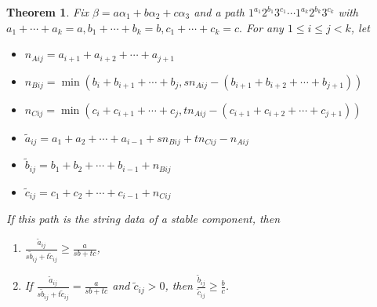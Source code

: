 \documentclass{amsart}
\numberwithin{equation}{section}
\numberwithin{figure}{section}
\numberwithin{table}{section}
\newtheorem{Theorem}[equation]{Theorem}
\theoremstyle{definition}
\begin{document}
\begin{Theorem} \label{th:cond2}
Fix  $\beta= a\alpha_1+b\alpha_2+c \alpha_3$ and a path $1^{a_1}2^{b_1} 3^{c_1} \cdots 1^{a_k}2^{b_k}3^{c_k}$ with
$a_1+\cdots + a_k=a, b_1+\cdots + b_k=b, c_1+\cdots + c_k=c.$ For any  
 $ 1\leq i \leq j < k$, let
\begin{itemize}
    \item $n_{Aij}=a_{i+1}+a_{i+2}+\cdots+a_{j+1}$
    \item $n_{Bij}=\min(b_i+b_{i+1}+\cdots+b_{j},sn_{Aij}-(b_{i+1}+b_{i+2}+\cdots+b_{j+1}))$
    \item $n_{Cij}=\min(c_i+c_{i+1}+\cdots+c_{j}, tn_{Aij}-(c_{i+1}+c_{i+2}+\cdots+c_{j+1}))$
    \vspace{.25cm} 
    \item $\tilde a_{ij}=a_1+a_2+\cdots+a_{i-1}+sn_{Bij}+tn_{Cij}-n_{Aij}$
    \item $\tilde b_{ij}=b_1+b_2+\cdots+b_{i-1} + n_{Bij} $
    \item $\tilde c_{ij}=c_1+c_2+\cdots+c_{i-1}+ n_{Cij}$
\end{itemize}
If this path is the string data of a stable component, then 
\begin{enumerate}
    \item $\frac{\tilde a_{ij}}{s\tilde b_{ij}+t\tilde c_{ij}} \geq \frac{a}{sb+tc}$,
    \item If $\frac{\tilde a_{ij}}{s\tilde b_{ij}+t\tilde c_{ij}} = \frac{a}{sb+tc}$ and $\tilde c_{ij}>0$, then $\frac{\tilde b_{ij}}{\tilde c_{ij}} \geq \frac{b}{c}$.
\end{enumerate}
\end{Theorem}
\end{document}
